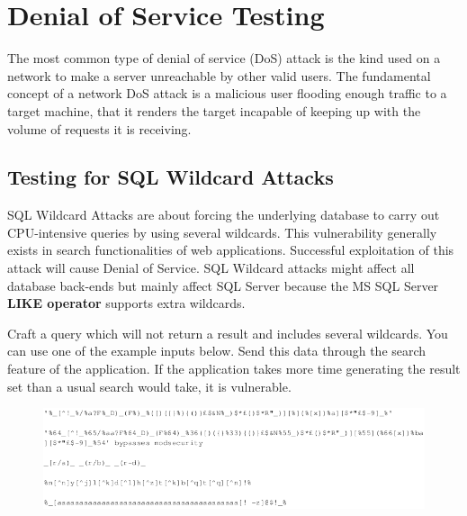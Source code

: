 \chapter{Denial of Service Testing}

	The most common type of denial of service (DoS) attack is the kind used on a network to make 
	a server unreachable by other valid users. The fundamental concept of a network DoS attack 
	is a malicious user flooding enough traffic to a target machine, that it renders the target 
	incapable of keeping up with the volume of requests it is receiving. 

	\section{Testing for SQL Wildcard Attacks}

	SQL Wildcard Attacks are about forcing the underlying database to carry out CPU-intensive queries 
	by using several wildcards. This vulnerability generally exists in search functionalities of web
	applications. Successful exploitation of this attack will cause Denial of Service.
	SQL Wildcard attacks might affect all database back-ends but mainly affect SQL Server because the 
	MS SQL Server {\bf LIKE operator} supports extra wildcards.

	Craft a query which will not return a result and includes several wildcards. You can use one of 
	the example inputs below. Send this data through the search feature of the application. If the 
	application takes more time generating the result set than a usual search would take, it is 
	vulnerable.

	\begin{figure}[H]
		\includegraphics[width=\textwidth]{pics/DOS1.png}
	\end{figure}

